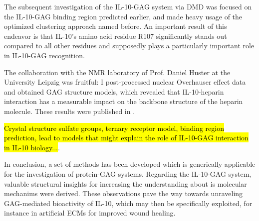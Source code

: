 The subsequent investigation of the IL-10-GAG system via DMD was focused on the
IL-10-GAG binding region predicted earlier, and made heavy usage of the
optimized clustering approach named before. An important result of this endeavor
is that IL-10's amino acid residue R107 significantly stands out compared to all
other residues and supposedly plays a particularly important role in IL-10-GAG
recognition.

The collaboration with the NMR laboratory of Prof. Daniel Huster at the
University Leipzig was fruitful: I post-processed nuclear Overhauser effect data
and obtained GAG structure models, which revealed that IL-10-heparin interaction
has a measurable impact on the backbone structure of the heparin molecule. These
results were published in \cite{kuenze_gehrcke_2014}.

\hl{Crystal structure sulfate groups, ternary receptor model, binding region
prediction, lead to models that might explain the role of IL-10-GAG interaction
in IL-10 biology...}.

In conclusion, a set of methods has been developed which is generically
applicable for the investigation of protein-GAG systems. Regarding the IL-10-GAG
system, valuable structural insights for increasing the understanding about is
molecular mechanims were derived. These observations pave the way towards
unraveling GAG-mediated bioactivity of IL-10, which may then be specifically
exploited, for instance in artificial ECMs for improved wound healing.
